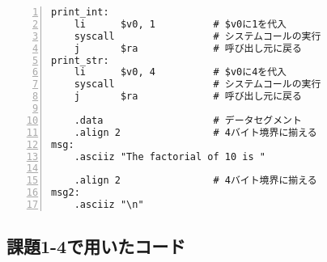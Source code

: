 \begin{Verbatim}[numbers=left, xleftmargin=10mm, numbersep=6pt,
                    fontsize=\small, baselinestretch=0.8]
print_int:
    li      $v0, 1          # $v0に1を代入
    syscall                 # システムコールの実行
    j       $ra             # 呼び出し元に戻る
print_str:
    li      $v0, 4          # $v0に4を代入
    syscall                 # システムコールの実行
    j       $ra             # 呼び出し元に戻る

    .data                   # データセグメント
    .align 2                # 4バイト境界に揃える
msg:
    .asciiz "The factorial of 10 is "

    .align 2                # 4バイト境界に揃える
msg2:
    .asciiz "\n"
\end{Verbatim}

\subsection{課題1-4で用いたコード} \label{sec:p1-4}
